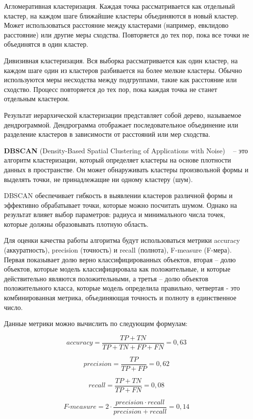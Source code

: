 Агломеративная кластеризация. Каждая точка рассматривается как отдельный кластер, на каждом шаге ближайшие кластеры объединяются в новый кластер. Может использоваться расстояние между кластерами (например, евклидово расстояние) или другие меры сходства. Повторяется до тех пор, пока все точки не объединятся в один кластер.
    
Дивизивная кластеризация. Вся выборка рассматривается как один кластер, на каждом шаге один из кластеров разбивается на более мелкие кластеры. Обычно используются меры несходства между подгруппами, такие как расстояние или сходство. Процесс повторяется до тех пор, пока каждая точка не станет отдельным кластером.
    
Результат иерархической кластеризации представляет собой дерево, называемое дендрограммой. Дендрограмма отображает последовательное объединение или разделение кластеров в зависимости от расстояний или мер сходства.

\textbf{DBSCAN} (Density-Based Spatial Clustering of Applications with Noise) ~\cite{dbscan} – это алгоритм кластеризации, который определяет кластеры на основе плотности данных в пространстве. Он может обнаруживать кластеры произвольной формы и выделять точки, не принадлежащие ни одному кластеру (шум).
    
DBSCAN обеспечивает гибкость в выявлении кластеров различной формы и эффективно обрабатывает точки, которые можно посчитать шумом. Однако на результат влияет выбор параметров: радиуса и минимального числа точек, которые должны образовывать плотную область.

Для оценки качества работы алгоритма будут использоваться метрики accuracy (аккуратность), precision (точность) и recall (полнота), F-measure (F-мера). Первая показывает долю верно классифицированных объектов, вторая – долю объектов, которые модель классифицировала как положительные, и которые действительно являются положительными, а третья – долю объектов положительного класса, которые модель определила правильно, четвертая - это комбинированная метрика, объединяющая точность и полноту в единственное число. 

Данные метрики можно вычислить по следующим формулам:


$$
accuracy = \frac{TP+TN}{TP+TN+FP+FN} = 0,63
$$

$$
precision = \frac{TP}{TP+FP} =  0,62
$$

$$
recall = \frac{TP+TN}{TP+FN} = 0,08
$$

$$
F\text{-}measure = 2\cdot \frac{precision \cdot recall}{precision+recall} = 0,14
$$

